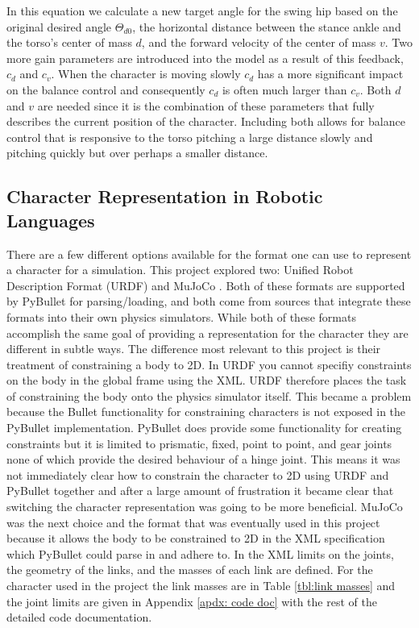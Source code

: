 \documentclass[12pt, a4paper]{article}
\begin{document}
In this equation we calculate a new target angle for the swing hip based on the original desired angle $\Theta_{d0}$, the horizontal distance between the stance ankle and the torso's center of mass $d$, and the forward velocity of the center of mass $v$. Two more gain parameters are introduced into the model as a result of this feedback, $c_d$ and $c_v$. When the character is moving slowly $c_d$ has a more significant impact on the balance control and consequently $c_d$ is often much larger than $c_v$. Both $d$ and $v$ are needed since it is the combination of these parameters that fully describes the current position of the character. Including both allows for balance control that is responsive to the torso pitching a large distance slowly and pitching quickly but over perhaps a smaller distance. 

\subsection{Character Representation in Robotic Languages}
There are a few different options available for the format one can use to represent a character for a simulation. This project explored two: Unified Robot Description Format (URDF) \cite{urdf} and MuJoCo \cite{mujoco}. Both of these formats are supported by PyBullet for parsing/loading, and both come from sources that integrate these formats into their own physics simulators. While both of these formats accomplish the same goal of providing a representation for the character they are different in subtle ways. The difference most relevant to this project is their treatment of constraining a body to 2D. In URDF you cannot specifiy constraints on the body in the global frame using the XML. URDF therefore places the task of constraining the body onto the physics simulator itself. This became a problem because the Bullet functionality for constraining characters is not exposed in the PyBullet implementation. PyBullet does provide some functionality for creating constraints but it is limited to prismatic, fixed, point to point, and gear joints none of which provide the desired behaviour of a hinge joint. This means it was not immediately clear how to constrain the character to 2D using URDF and PyBullet together and after a large amount of frustration it became clear that switching the character representation was going to be more beneficial. MuJoCo was the next choice and the format that was eventually used in this project because it allows the body to be constrained to 2D in the XML specification which PyBullet could parse in and adhere to. In the XML limits on the joints, the geometry of the links, and the masses of each link are defined. For the character used in the project the link masses are in Table \ref{tbl:link masses} and the joint limits are given in Appendix \ref{apdx: code doc} with the rest of the detailed code documentation.
\end{document}
